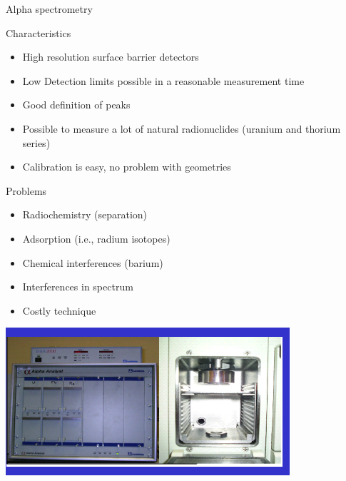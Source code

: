 \begin{frame}[allowframebreaks]{Alpha spectrometry}

\begin{exampleblock}{Characteristics}

\begin{itemize}
	\item High resolution surface barrier detectors
  \item Low Detection limits possible in a reasonable measurement time
  \item Good definition of peaks
 \item Possible to measure a lot of natural radionuclides (uranium and thorium series)
\item  Calibration is easy, no problem with geometries
\end{itemize}

\end{exampleblock}

\begin{alertblock}{Problems}

\begin{itemize}
	\item Radiochemistry (separation)
 \item Adsorption (i.e., radium isotopes)
\item  Chemical interferences (barium) 
 \item Interferences in spectrum
 \item Costly technique
\end{itemize}

\end{alertblock}

%

\centering
\includegraphics[scale=0.8]{figures/alpha_device.png}

\end{frame}


